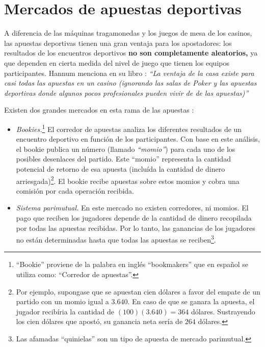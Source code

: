  \section{Mercados de apuestas deportivas}
 
 A diferencia de las máquinas tragamonedas y los juegos de mesa de los casinos, las apuestas deportivas tienen una gran ventaja para los apostadores: los resultados de los encuentros deportivos \textbf{no son completamente aleatorios,} ya que dependen en cierta medida del nivel de juego que tienen los equipos participantes. Hannum menciona en su libro \cite{hannum2005practical} : \emph{``La ventaja de la casa existe para casi todas las apuestas en un casino (ignorando las salas de Poker y las apuestas deportivas donde algunos pocos profesionales pueden vivir de de las apuestas)''}

 Existen dos grandes mercados en esta rama de las apuestas \cite{chung2010empirical}:
 \begin{itemize} 
 	\item \emph{Bookies.}\footnote{``Bookie'' proviene de la palabra en inglés ``bookmakers'' que en español se utiliza como: ``Corredor de apuestas''.} El corredor de apuestas analiza los diferentes resultados de un encuentro deportivo en función de los participantes. Con base en este análisis, el bookie publica un número (llamado \emph{``momio''}) para cada uno de los posibles desenlaces del partido. Este ``momio'' representa la cantidad potencial de retorno de esa apuesta (incluída la cantidad de dinero arriesgada)\footnote{Por ejemplo, supongase que se apuestan cien dólares a favor del empate de un partido con un momio igual a $3.640$. En caso de que se ganara la apuesta, el jugador recibíria la cantidad de $(100)(3.640) = 364$ dólares. Sustrayendo los cien dólares que apostó, su ganancia neta sería de $264$ dólares.}. El bookie recibe apuestas sobre estos momios y cobra una comisión por cada operación recibida. 
 	\item \emph{Sistema parimutual.} En este mercado no existen  corredores, ni momios. El pago que reciben los jugadores depende de la cantidad de dinero recopilada por todas las apuestas recibidas. Por lo tanto, las ganancias de los jugadores no están determinadas hasta que todas las apuestas se reciben\footnote{Las afamadas ``quinielas'' son un tipo de apuesta de mercado parimutual.}.
 	\end{itemize}

